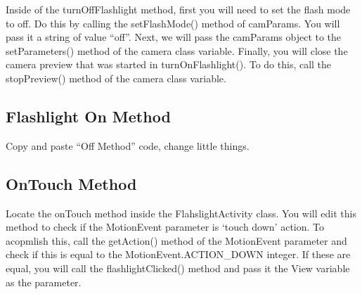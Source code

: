 Inside of the turnOffFlashlight method, first you will need to set the flash mode to off. 
Do this by calling the setFlashMode() method of camParams. 
You will pass it a string of value “off”. 
Next, we will pass the camParams object to the setParameters() method of the camera class variable. 
Finally, you will close the camera preview that was started in turnOnFlashlight(). 
To do this, call the stopPreview() method of the camera class variable.

\subsection{Flashlight On Method}
Copy and paste “Off Method” code, change little things.

\subsection{OnTouch Method}
Locate the onTouch method inside the FlahslightActivity class. 
You will edit this method to check if the MotionEvent parameter is ‘touch down’ action. 
To acopmlish this, call the getAction() method of the MotionEvent parameter and check if this is equal to the MotionEvent.ACTION\_DOWN integer. 
If these are equal, you will call the flashlightClicked() method and pass it the View variable as the parameter.


